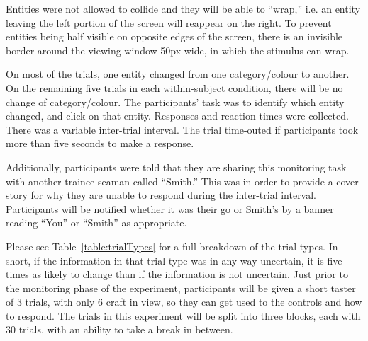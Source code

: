 \documentclass[doc, a4paper, apacite]{apa6}
\begin{document}
Entities were not allowed to collide and they will be able to ``wrap,'' i.e. an entity leaving the left portion of the screen will reappear on the right.
To prevent entities being half visible on opposite edges of the screen, there is an invisible border around the viewing window 50px wide, in which the stimulus can wrap. 

On most of the trials, one entity changed from one category/colour to another. 
On the remaining five trials in each within-subject condition, there will be no change of category/colour. 
The participants' task was to identify which entity changed, and click on that entity. 
Responses and reaction times were collected. 
There was a variable inter-trial interval. 
The trial time-outed if participants took more than five seconds to make a response. 

Additionally, participants were told that they are sharing this monitoring task with another trainee seaman called ``Smith.'' 
This was in order to provide a cover story for why they are unable to respond during the inter-trial interval. 
Participants will be notified whether it was their go or Smith's by a banner reading ``You'' or ``Smith'' as appropriate. 

Please see Table~\ref{table:trialTypes} for a full breakdown of the trial types.
In short, if the information in that trial type was in any way uncertain, it is five times as likely to change than if the information is not uncertain. 
Just prior to the monitoring phase of the experiment, participants will be given a short taster of 3 trials, with only 6 craft in view, so they can get used to the controls and how to respond. 
The trials in this experiment will be split into three blocks, each with 30 trials, with an ability to take a break in between. 
\end{document}
